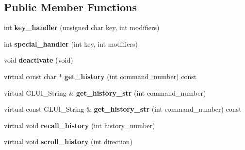 \subsection*{Public Member Functions}
\begin{DoxyCompactItemize}
\item 
\hypertarget{class_g_l_u_i___command_line_aac74b2f165792141d6665de1690d0aa4}{int {\bfseries key\+\_\+handler} (unsigned char key, int modifiers)}\label{class_g_l_u_i___command_line_aac74b2f165792141d6665de1690d0aa4}

\item 
\hypertarget{class_g_l_u_i___command_line_a88dafdb294350ff13c68973b59c308d1}{int {\bfseries special\+\_\+handler} (int key, int modifiers)}\label{class_g_l_u_i___command_line_a88dafdb294350ff13c68973b59c308d1}

\item 
\hypertarget{class_g_l_u_i___command_line_a827fe6510aa5a38b0d2c5d016a93e1ba}{void {\bfseries deactivate} (void)}\label{class_g_l_u_i___command_line_a827fe6510aa5a38b0d2c5d016a93e1ba}

\item 
\hypertarget{class_g_l_u_i___command_line_a565145da6c84b9f925ca30735fc27686}{virtual const char $\ast$ {\bfseries get\+\_\+history} (int command\+\_\+number) const }\label{class_g_l_u_i___command_line_a565145da6c84b9f925ca30735fc27686}

\item 
\hypertarget{class_g_l_u_i___command_line_a43403d60b3ac8534b84393c5328b7a03}{virtual G\+L\+U\+I\+\_\+\+String \& {\bfseries get\+\_\+history\+\_\+str} (int command\+\_\+number)}\label{class_g_l_u_i___command_line_a43403d60b3ac8534b84393c5328b7a03}

\item 
\hypertarget{class_g_l_u_i___command_line_a9365735c17057bea2039db66d8df67f3}{virtual const G\+L\+U\+I\+\_\+\+String \& {\bfseries get\+\_\+history\+\_\+str} (int command\+\_\+number) const }\label{class_g_l_u_i___command_line_a9365735c17057bea2039db66d8df67f3}

\item 
\hypertarget{class_g_l_u_i___command_line_a24c54c2606a9f0352fe427f84fa4b2f2}{virtual void {\bfseries recall\+\_\+history} (int history\+\_\+number)}\label{class_g_l_u_i___command_line_a24c54c2606a9f0352fe427f84fa4b2f2}

\item 
\hypertarget{class_g_l_u_i___command_line_a0396c90a0adb828dd8c4ba294873494d}{virtual void {\bfseries scroll\+\_\+history} (int direction)}\label{class_g_l_u_i___command_line_a0396c90a0adb828dd8c4ba294873494d}


\end{DoxyCompactItemize}
